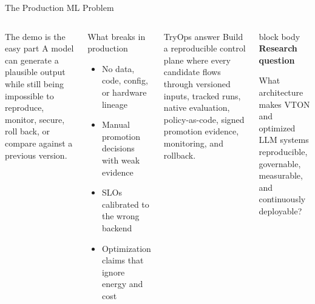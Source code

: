 \documentclass[aspectratio=169,10pt]{beamer}
\newcommand{\source}[1]{%
}
\begin{document}
\begin{frame}{The Production ML Problem}
  \small
  \begin{columns}[T,totalwidth=\textwidth]
    \begin{block}{The demo is the easy part}
      A model can generate a plausible output while still being impossible to reproduce, monitor, secure, roll back, or compare against a previous version.
    \end{block}

    \begin{alertblock}{What breaks in production}
      \begin{itemize}\itemsep0.24em
        \item No data, code, config, or hardware lineage
        \item Manual promotion decisions with weak evidence
        \item SLOs calibrated to the wrong backend
        \item Optimization claims that ignore energy and cost
      \end{itemize}
    \end{alertblock}

    \begin{exampleblock}{TryOps answer}
      Build a reproducible control plane where every candidate flows through versioned inputs, tracked runs, native evaluation, policy-as-code, signed promotion evidence, monitoring, and rollback.
    \end{exampleblock}

    \begin{beamercolorbox}[wd=\textwidth,rounded=true,sep=0.9em]{block body}
      \textbf{Research question}\par
      What architecture makes VTON and optimized LLM systems reproducible, governable, measurable, and continuously deployable?
    \end{beamercolorbox}
  \end{columns}
  \source{\texttt{reports/final\_report.md}, Sections 1--4.}
\end{frame}
\end{document}
